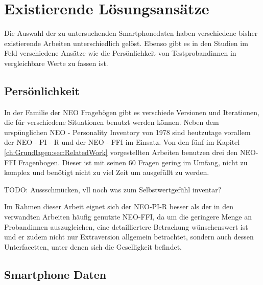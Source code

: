 \section{Existierende Lösungsansätze}
\label{ch:Analyse:sec:RelatedWork}

Die Auswahl der zu untersuchenden Smartphonedaten haben verschiedene bisher existierende Arbeiten unterschiedlich gelöst.
Ebenso gibt es in den Studien im Feld verschiedene Ansätze wie die Persönlichkeit von Testprobandinnen in vergleichbare Werte zu fassen ist.

\subsection{Persönlichkeit}

In der Familie der NEO Fragebögen gibt es verschiede Versionen und Iterationen, die für verschiedene Situationen benutzt werden können.
Neben dem urspünglichen NEO - Personality Inventory von 1978 sind heutzutage vorallem der NEO - PI - R und der NEO - FFI im Einsatz.
Von den fünf im Kapitel \ref{ch:Grundlagen:sec:RelatedWork} vorgestellten Arbeiten benutzen drei den NEO-FFI Fragenbogen. 
Dieser ist mit seinen 60 Fragen gering im Umfang, nicht zu komplex und benötigt nicht zu viel Zeit um ausgefüllt zu werden.

\par
TODO: Aussschmücken, vll noch was zum Selbstwertgefühl inventar?

\par
Im Rahmen dieser Arbeit eignet sich der NEO-PI-R besser als der in den verwandten Arbeiten häufig genutzte NEO-FFI, 
da um die geringere Menge an Probandinnen auszugleichen, eine detailliertere Betrachung wünschenswert ist und 
er zudem nicht nur Extraversion allgemein betrachtet, sondern auch dessen Unterfacetten, unter denen sich die Geselligkeit befindet.

\subsection{Smartphone Daten}

